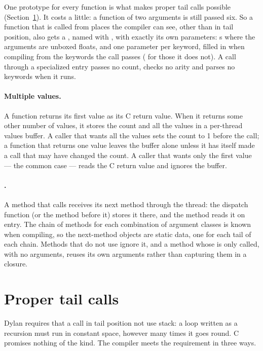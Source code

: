One prototype for every function is what makes proper tail calls
possible (Section~\ref{sec:internals-tail}). It costs a little: a
function of two arguments is still passed six. So a function that is
called from places the compiler can see, other than in tail position,
also gets a , named with , with
exactly its own parameters: s where the arguments are
unboxed floats, and one parameter per keyword, filled in when compiling
from the keywords the call passes ( for those it
does not). A call through a specialized entry passes no count, checks
no arity and parses no keywords when it runs.

\paragraph{Multiple values.}
A function returns its first value as its C return value. When it
returns some other number of values, it stores the count and all the
values in a per-thread values buffer. A caller that wants all the values
sets the count to 1 before the call; a function that returns one value
leaves the buffer alone unless it has itself made a call that may have
changed the count. A caller that wants only the first value --- the
common case --- reads the C return value and ignores the buffer.

\paragraph{.}
A method that calls  receives its next method through
the thread: the dispatch function (or the method before it) stores it
there, and the method reads it on entry. The chain of methods for each
combination of argument classes is known when compiling, so the
next-method objects are static data, one for each tail of each chain.
Methods that do not use  ignore it, and a method
whose  is only called, with no arguments, reuses its
own arguments rather than capturing them in a closure.

\section{Proper tail calls}\label{sec:internals-tail}

Dylan requires that a call in tail position not use stack: a loop
written as a recursion must run in constant space, however many times it
goes round. C promises nothing of the kind. The compiler meets the
requirement in three ways.

